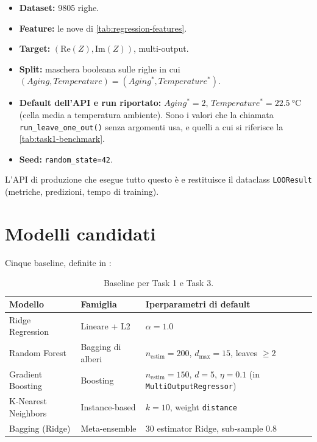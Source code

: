 \begin{itemize}
  \item \textbf{Dataset:} \num{9805} righe.
  \item \textbf{Feature:} le nove di \cref{tab:regression-features}.
  \item \textbf{Target:} $(\mathrm{Re}(Z), \mathrm{Im}(Z))$, multi-output.\newline
  \item \textbf{Split:} maschera booleana sulle righe in cui 
        $(Aging, Temperature) = (Aging^*, Temperature^*)$.
  \item \textbf{Default dell'API e run riportato:} $Aging^*=2$,
        $Temperature^* = \SI{22.5}{\celsius}$ (cella media a temperatura
        ambiente). Sono i valori che la chiamata
        \texttt{run\_leave\_one\_out()} senza argomenti usa, e quelli
        a cui si riferisce la \cref{tab:task1-benchmark}.
  \item \textbf{Seed:} \texttt{random\_state=42}.
\end{itemize}

L'API di produzione che esegue tutto questo è
 e restituisce il dataclass \texttt{LOOResult}
(metriche, predizioni, tempo di training).

\section{Modelli candidati}

Cinque baseline, definite in :

\begin{table}[H]
  \centering
  \caption{Baseline per Task 1 e Task 3.}
  \label{tab:task1-models}
  \begin{tabularx}{\linewidth}{l l X}
    \toprule
    \textbf{Modello} & \textbf{Famiglia} & \textbf{Iperparametri di default} \\
    \midrule
    Ridge Regression & Lineare + L2~\cite{hoerl1970ridge} & $\alpha = 1.0$ \\
    Random Forest & Bagging di alberi~\cite{breiman2001random} & $n_\text{estim}=200$, $d_\text{max}=15$, leaves $\geq 2$ \\
    Gradient Boosting & Boosting~\cite{friedman2001greedy} & $n_\text{estim}=150$, $d=5$, $\eta=0.1$ (in \texttt{MultiOutputRegressor}) \\
    K-Nearest Neighbors & Instance-based & $k=10$, weight \texttt{distance} \\
    Bagging (Ridge) & Meta-ensemble & 30 estimator Ridge, sub-sample $0.8$ \\
    \bottomrule
  \end{tabularx}
\end{table}

